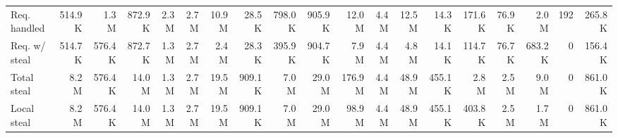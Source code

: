 \begin{table*}[!ht]
{\begin{tabular}{lrr|rr|rr|rr|rr|rr|rr|rr|rr|}
\multicolumn{1}{|l|}{Req. handled} & 514.9 K & 1.3 M & 872.9 K & 2.3 M & 2.7 M & 10.9 M & 28.5 K & 798.0 K & 905.9 K & 12.0 M & 4.4 M & 12.5 M & 14.3 K & 171.6 K & 76.9 K & 2.0 M & 192  & 265.8 K \\
\multicolumn{1}{|l|}{Req. w/ steal} & 514.7 K & 576.4 K & 872.7 K & 1.3 M & 2.7 M & 2.4 M & 28.3 K & 395.9 K & 904.7 K & 7.9 M & 4.4 M & 4.8 M & 14.1 K & 114.7 K & 76.7 K & 683.2 K & 0  & 156.4 K \\
\multicolumn{1}{|l|}{Total steal} & 8.2 M & 576.4 K & 14.0 M & 1.3 M & 2.7 M & 19.5 M & 909.1 K & 7.0 M & 29.0 M & 176.9 M & 4.4 M & 48.9 M & 455.1 K & 2.8 M & 2.5 M & 9.0 M & 0  & 861.0 K \\
\multicolumn{1}{|l|}{Local steal} & 8.2 M & 576.4 K & 14.0 M & 1.3 M & 2.7 M & 19.5 M & 909.1 K & 7.0 M & 29.0 M & 98.9 M & 4.4 M & 48.9 M & 455.1 K & 403.8 K & 2.5 M & 1.7 M & 0  & 861.0 K \\
\hline

\end{tabular}}
\end{table*}
